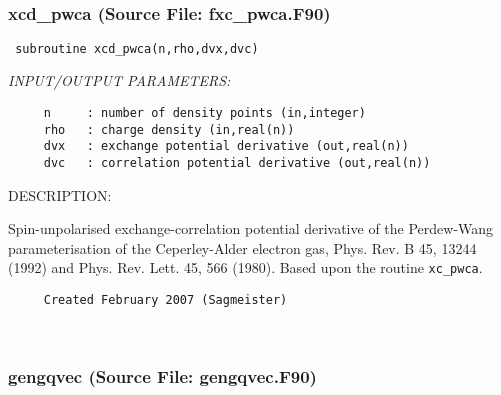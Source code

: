 \documentclass[11pt]{article}
\begin{document}



 
 
\mbox{}\hrulefill\ 
 
\subsubsection{xcd\_pwca (Source File: fxc\_pwca.F90)}


\begin{verbatim} subroutine xcd_pwca(n,rho,dvx,dvc)\end{verbatim}{\em INPUT/OUTPUT PARAMETERS:}
\begin{verbatim}     n     : number of density points (in,integer)
     rho   : charge density (in,real(n))
     dvx   : exchange potential derivative (out,real(n))
     dvc   : correlation potential derivative (out,real(n))\end{verbatim}
{\sf DESCRIPTION:\\ }


     Spin-unpolarised exchange-correlation potential derivative of the 
     Perdew-Wang
     parameterisation of the Ceperley-Alder electron gas,
     Phys. Rev. B 45, 13244
     (1992) and Phys. Rev. Lett. 45, 566 (1980). Based upon the routine
     {\tt xc\_pwca}.
  
\begin{verbatim}     Created February 2007 (Sagmeister)\end{verbatim}








 
 
\mbox{}\hrulefill\ 
 
\subsubsection{gengqvec (Source File: gengqvec.F90)}
\end{document}
